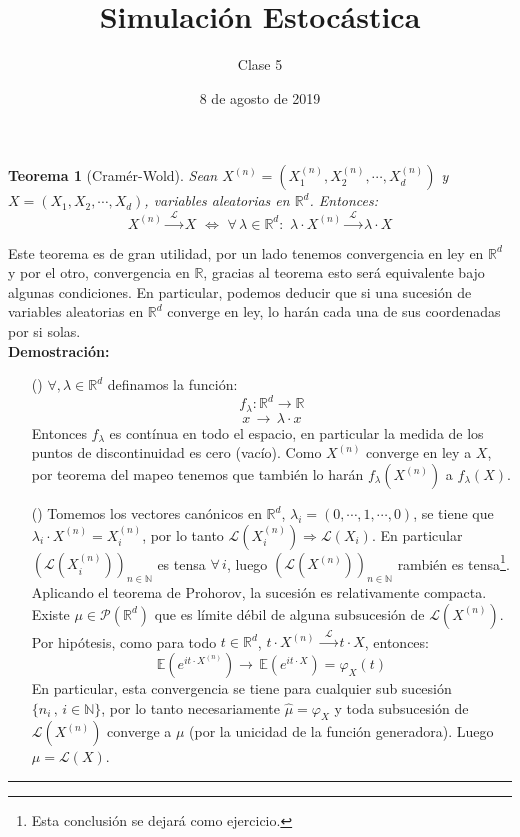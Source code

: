 \documentclass[a4paper]{article}
\title{Simulación Estocástica}
\author{Clase 5}
\date{8 de agosto de 2019}
\newtheorem{teorema}{Teorema}
\numberwithin{equation}{subsection}
\numberwithin{definicion}{subsection}
\def\R{\mathbb R}
\def\N{\mathbb N}
\def\E{\mathbb E}
\begin{document}
\maketitle

\begin{teorema}[Cramér-Wold] Sean $X^{(n)} = (X_1^{(n)},X_2^{(n)},\cdots,X_d^{(n)})$ y $X=(X_1,X_2,\cdots,X_d)$, variables aleatorias en $\R^d$. Entonces:
\[X^{(n)}\xrightarrow{\,\,\mathcal{L}\,\,}X\,\,\Longleftrightarrow\,\,\forall\,\lambda\in\R^d:\,\,\lambda\cdot X^{(n)}\xrightarrow{\,\,\mathcal{L}\,\,}\lambda\cdot X\]
\end{teorema}
Este teorema es de gran utilidad, por un lado tenemos convergencia en ley en $\R^d$ y por el otro, convergencia en $\R$, gracias al teorema esto será equivalente bajo algunas condiciones. En particular, podemos deducir que si una sucesión de variables aleatorias en $\R^d$ converge en ley, lo harán cada una de sus coordenadas por si solas.\\ \newline
\textbf{Demostración: }
\begin{itemize}
    \item[(\Rightarrow)]  $\forall,\lambda\in\R^d$ definamos la función:
    \[f_{\lambda}: \R^d\rightarrow\R\]
    \[x\,\rightarrow\,\lambda\cdot x\]
    Entonces $f_{\lambda}$ es contínua en todo el espacio, en particular la medida de los puntos de discontinuidad es cero (vacío). Como $X^{(n)}$ converge en ley a $X$, por teorema del mapeo tenemos que también lo harán $f_{\lambda}(X^{(n)})$ a $f_{\lambda}(X)$.
    \item[(\Leftarrow)] Tomemos los vectores canónicos en $\R^d$, $\lambda_i = (0,\cdots,1,\cdots,0)$, se tiene que $\lambda_i \cdot X^{(n)} = X_i^{(n)}$, por lo tanto $\mathcal{L}(X_i^{(n)})\Rightarrow \mathcal{L}(X_i)$. En particular $\left(\mathcal{L}(X_i^{(n)})\right)_{n\in\N}$ es tensa $\forall\,i$, luego $\left(\mathcal{L}(X^{(n)})\right)_{n\in\N}$ rambién es tensa\footnote{Esta conclusión se dejará como ejercicio.}. Aplicando el teorema de Prohorov, la sucesión es relativamente compacta. \\ \newline
    Existe $\mu\in\mathcal{P}(\R^d)$ que es límite débil de alguna subsucesión de $\mathcal{L}(X^{(n)})$. Por hipótesis,  como para todo $t\in\R^d$, $t\cdot X^{(n)}\,\xrightarrow{\,\,\mathcal{L}\,\,}t\cdot X$, entonces:
    \[\E(e^{it\cdot X^{(n)}}) \rightarrow\,\E(e^{it\cdot X}) = \varphi_X(t)\]
    En particular, esta convergencia se tiene para cualquier sub sucesión $\{n_i\,,\,i\in\N\}$, por lo tanto necesariamente $\hat{\mu}=\varphi_X$ y toda subsucesión de $\mathcal{L}(X^{(n)})$ converge a $\mu$ (por la unicidad de la función generadora). Luego $\mu = \mathcal{L}(X)$. 
\end{itemize}
\rule{0.7em}{0.7em}
\end{document}
